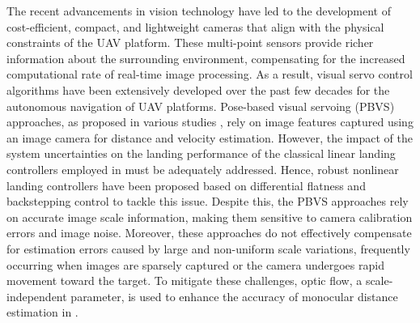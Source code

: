 \documentclass{IEEEtaes}
\begin{document}
The recent advancements in vision technology have led to the development of cost-efficient, compact, and lightweight cameras that align with the physical constraints of the UAV platform. 
These multi-point sensors provide richer information about the surrounding environment, compensating for the increased computational rate of real-time image processing.
As a result, visual servo control algorithms have been extensively developed over the past few decades for the autonomous navigation of UAV platforms.
Pose-based visual servoing (PBVS) approaches, as proposed in various studies \cite{shakernia1999, wenzel2011, benini2018, lin2022}, rely on image features captured using an image camera for distance and velocity estimation.
However, the impact of the system uncertainties on the landing performance of the classical linear landing controllers employed in \cite{wenzel2011, benini2018} must be adequately addressed.
Hence, robust nonlinear landing controllers have been proposed based on differential flatness \cite{shakernia1999} and backstepping control \cite{lin2022} to tackle this issue.
Despite this, the PBVS approaches rely on accurate image scale information, making them sensitive to camera calibration errors and image noise.
Moreover, these approaches do not effectively compensate for estimation errors caused by large and non-uniform scale variations, frequently occurring when images are sparsely captured or the camera undergoes rapid movement toward the target.   
To mitigate these challenges, optic flow, a scale-independent parameter, is used to enhance the accuracy of monocular distance estimation in \cite{deCroon2016}.
\end{document}
